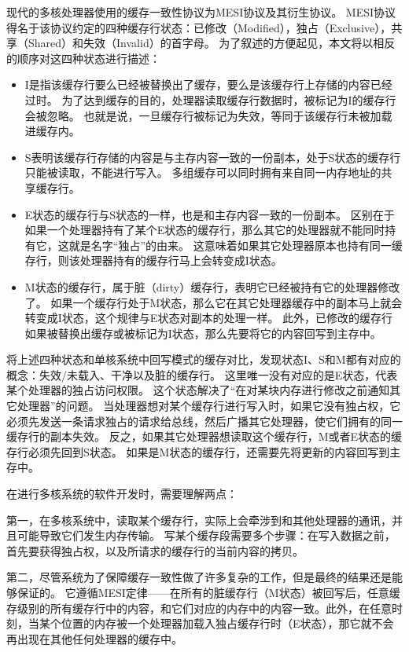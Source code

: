 现代的多核处理器使用的缓存一致性协议为MESI协议及其衍生协议。
MESI协议得名于该协议约定的四种缓存行状态：已修改（Modified），独占（Exclusive），共享（Shared）和失效（Invalid）的首字母。
为了叙述的方便起见，本文将以相反的顺序对这四种状态进行描述：
\begin{itemize}
	\item I是指该缓存行要么已经被替换出了缓存，要么是该缓存行上存储的内容已经过时。
	为了达到缓存的目的，处理器读取缓存行数据时，被标记为I的缓存行会被忽略。
	也就是说，一旦缓存行被标记为失效，等同于该缓存行未被加载进缓存内。
	\item S表明该缓存行存储的内容是与主存内容一致的一份副本，处于S状态的缓存行只能被读取，不能进行写入。
	多组缓存可以同时拥有来自同一内存地址的共享缓存行。
	\item E状态的缓存行与S状态的一样，也是和主存内容一致的一份副本。
	区别在于如果一个处理器持有了某个E状态的缓存行，那么其它的处理器就不能同时持有它，这就是名字“独占”的由来。
	这意味着如果其它处理器原本也持有同一缓存行，则该处理器持有的缓存行马上会转变成I状态。
	\item M状态的缓存行，属于脏（dirty）缓存行，表明它已经被持有它的处理器修改了。
	如果一个缓存行处于M状态，那么它在其它处理器缓存中的副本马上就会转变成I状态，这个规律与E状态对副本的处理一样。
	此外，已修改的缓存行如果被替换出缓存或被标记为I状态，那么先要将它的内容回写到主存中。
\end{itemize}

将上述四种状态和单核系统中回写模式的缓存对比，发现状态I、S和M都有对应的概念：失效/未载入、干净以及脏的缓存行。
这里唯一没有对应的是E状态，代表某个处理器的独占访问权限。
这个状态解决了“在对某块内存进行修改之前通知其它处理器”的问题。
当处理器想对某个缓存行进行写入时，如果它没有独占权，它必须先发送一条请求独占的请求给总线，然后广播其它处理器，使它们拥有的同一缓存行的副本失效。
反之，如果其它处理器想读取这个缓存行，M或者E状态的缓存行必须先回到S状态。
如果是M状态的缓存行，还需要先将更新的内容回写到主存中。

在进行多核系统的软件开发时，需要理解两点：

第一，在多核系统中，读取某个缓存行，实际上会牵涉到和其他处理器的通讯，并且可能导致它们发生内存传输。
写某个缓存段需要多个步骤：在写入数据之前，首先要获得独占权，以及所请求的缓存行的当前内容的拷贝。

第二，尽管系统为了保障缓存一致性做了许多复杂的工作，但是最终的结果还是能够保证的。
它遵循MESI定律\cite{Fabian-ryg}——在所有的脏缓存行（M状态）被回写后，任意缓存级别的所有缓存行中的内容，和它们对应的内存中的内容一致。此外，在任意时刻，当某个位置的内存被一个处理器加载入独占缓存行时（E状态），那它就不会再出现在其他任何处理器的缓存中。

